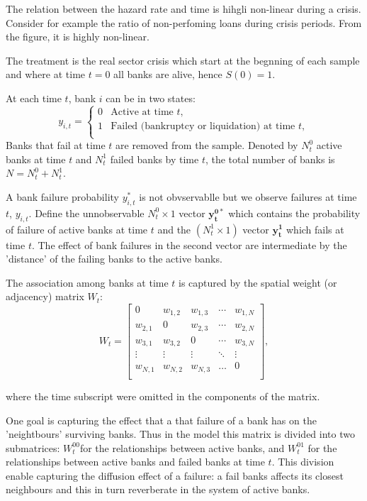 \documentclass[11pt,final]{article}%
\newcommand{\vect}[1]{\bm{#1}} %
\begin{document}
The relation between the hazard rate and time is hihgli non-linear during a crisis. Consider for example the ratio of non-perfoming loans during crisis periods. From the figure, it is highly non-linear.

The treatment is the real sector crisis which start at the begnning of each sample and where at time $t=0$ all banks are alive, hence $S(0) = 1$. 

At each time $t$, bank $i$ can be in two states:
\begin{equation}
y_{i, t} =
\begin{cases}
	0 &	\text{Active at time }t, \\
    1 &	\text{Failed (bankruptcy or liquidation) at time }t, \\
\end{cases}
\end{equation}
Banks that fail at time $t$ are removed from the sample.  Denoted by $N^{0}_{t}$ active banks at time $t$ and $N^{1}_{t}$ failed banks by time $t$, the total number of banks is $N = N^{0}_{t} + N^{1}_{t}$.


A bank failure probability $y^{*}_{i,t}$ is not obvservablle but we observe failures at time $t$,  $y_{i,t}$. Define the unnobservable $N_{t}^{0} \times 1$ vector $\vect{y^{0*}_{t}}$ which contains the probability of failure of active banks at time $t$ and the $(N_{t}^{1} \times 1)$ vector $\vect{y_{t}^{1}}$ which fails at time $t$. The effect of bank failures in the second vector are intermediate by the 'distance' of the failing banks to the active banks.

The association among banks at time $t$  is captured by the spatial weight (or adjacency) matrix $W_{t}$:
\begin{equation}
W_{t} = 
\begin{bmatrix}
	0			&	w_{1, 2}	&	w_{1,3}		&	\cdots	&	w_{1, N}	\\
    w_{2,1}	&	0				&	w_{2,3}				&	\cdots	&	w_{2, N}	\\
    w_{3,1}	&	w_{3, 2}	&	0				&	\cdots	&	w_{3, N}	\\
    \vdots 	& \vdots		&	\vdots		&	\ddots	&	\vdots	\\
    w_{N,1}	&	w_{N, 2}	&	w_{N,3}		&	\dots	&	0	\\
\end{bmatrix},
\end{equation}

where the time subscript were omitted in the components of the matrix. 

One goal is capturing the effect that a that failure of a bank has on the 'neightbours' surviving banks. Thus in the model this matrix is divided into two submatrices: $W^{00}_{t}$for the relationships between active banks, and $W^{01}_{t}$ for the relationships between active banks and failed banks at time $t$. This division enable capturing the diffusion  effect of a failure: a fail banks affects its closest neighbours and this in turn reverberate in the system of active banks. 
\end{document}
